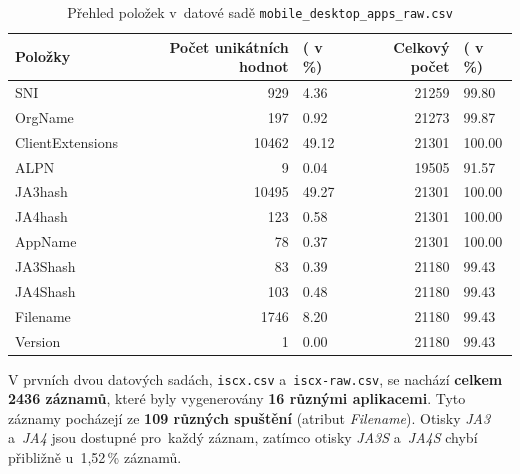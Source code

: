 \begin{table}[H]
	\centering
	\begin{tabular}{lrlrl}
		\toprule
		\textbf{Položky} & \textbf{Počet unikátních hodnot} & \textbf{( v\,\%)} & \textbf{Celkový počet} & ( \textbf{v\,\%)} \\
		\midrule
		SNI               & 929                                 & 4.36              & 21259                    & 99.80             \\
		OrgName           & 197                                 & 0.92              & 21273                    & 99.87             \\
		ClientExtensions  & 10462                               & 49.12             & 21301                    & 100.00            \\
		ALPN              & 9                                   & 0.04              & 19505                    & 91.57             \\
		JA3hash           & 10495                               & 49.27             & 21301                    & 100.00            \\
		JA4hash           & 123                                 & 0.58              & 21301                    & 100.00            \\
		AppName           & 78                                  & 0.37              & 21301                    & 100.00            \\
		JA3Shash          & 83                                  & 0.39              & 21180                    & 99.43             \\
		JA4Shash          & 103                                 & 0.48              & 21180                    & 99.43             \\
		Filename          & 1746                                & 8.20              & 21180                    & 99.43             \\
		Version           & 1                                   & 0.00              & 21180                    & 99.43             \\
		\bottomrule
	\end{tabular}
	\caption{Přehled položek v~datové sadě \texttt{mobile\_desktop\_apps\_raw.csv}}
	\label{tab:mobile}
\end{table}

V prvních dvou datových sadách, \texttt{iscx.csv} a~\texttt{iscx-raw.csv}, se nachází \textbf{celkem 2436 záznamů}, které byly vygenerovány \textbf{16 různými aplikacemi}. Tyto záznamy pocházejí ze \textbf{109 různých spuštění} (atribut \textit{Filename}). Otisky \textit{JA3} a~\textit{JA4} jsou dostupné pro~každý záznam, zatímco otisky \textit{JA3S} a~\textit{JA4S} chybí přibližně u~1,52\,\% záznamů.

